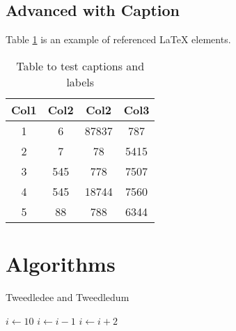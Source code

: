 \documentclass[12pt, letterpaper]{article}
\begin{document}
\subsection{Advanced with Caption}

Table \ref{table:data} is an example of referenced \LaTeX{} elements.

\begin{table}[h!]
  \centering
  \begin{tabular}{||c c c c||}
    \hline
    Col1 & Col2 & Col2  & Col3 \\ [0.5ex]
    \hline\hline
    1    & 6    & 87837 & 787  \\
    2    & 7    & 78    & 5415 \\
    3    & 545  & 778   & 7507 \\
    4    & 545  & 18744 & 7560 \\
    5    & 88   & 788   & 6344 \\ [1ex]
    \hline
  \end{tabular}
  \caption{Table to test captions and labels}
  \label{table:data}
\end{table}

\section{Algorithms}

\begin{algorithm}
  \captionsetup{labelsep=newline}
  \caption{Tweedledee and Tweedledum}
  $i\gets 10$\;
  {
    $i\gets i-1$\;
  }{
    {
      $i\gets i+2$\;
    }
  }
\end{algorithm}
\end{document}
